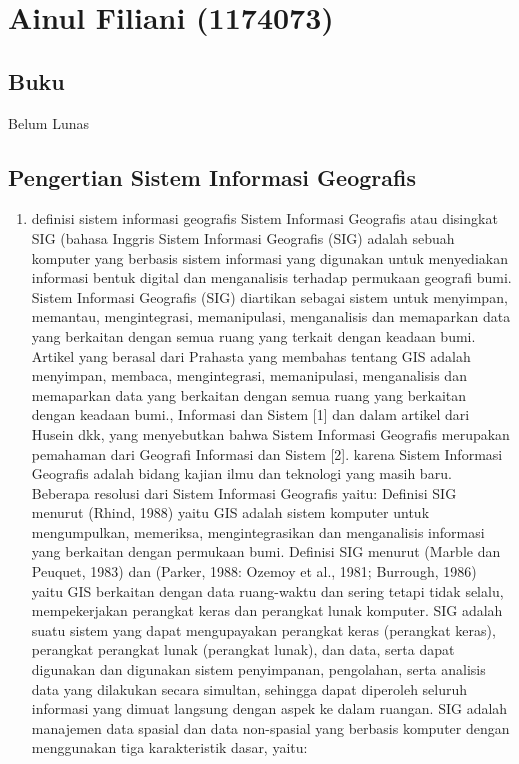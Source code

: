 \section{Ainul Filiani (1174073)}
\subsection{Buku}
Belum Lunas 
\subsection{Pengertian Sistem Informasi Geografis}
\begin{enumerate}
\item definisi sistem informasi geografis 
Sistem Informasi Geografis atau disingkat SIG (bahasa Inggris Sistem Informasi Geografis (SIG) adalah sebuah komputer yang berbasis sistem informasi yang digunakan untuk menyediakan informasi bentuk digital dan menganalisis terhadap permukaan geografi bumi. Sistem Informasi Geografis (SIG) diartikan sebagai sistem untuk menyimpan, memantau, mengintegrasi, memanipulasi, menganalisis dan memaparkan data yang berkaitan dengan semua ruang yang terkait dengan keadaan bumi. Artikel yang berasal dari Prahasta yang membahas tentang GIS adalah menyimpan, membaca, mengintegrasi, memanipulasi, menganalisis dan memaparkan data yang berkaitan dengan semua ruang yang berkaitan dengan keadaan bumi., Informasi dan Sistem 
[1] dan dalam artikel dari Husein dkk, yang menyebutkan bahwa Sistem Informasi Geografis merupakan pemahaman dari Geografi Informasi dan Sistem [2].
karena Sistem Informasi Geografis adalah bidang kajian ilmu dan teknologi yang masih baru. Beberapa resolusi dari Sistem Informasi Geografis yaitu:
Definisi SIG menurut (Rhind, 1988) yaitu GIS adalah sistem komputer untuk mengumpulkan, memeriksa, mengintegrasikan dan menganalisis informasi yang berkaitan dengan permukaan bumi. 
Definisi SIG menurut (Marble dan Peuquet, 1983) dan (Parker, 1988: Ozemoy et al., 1981; Burrough, 1986) yaitu GIS berkaitan dengan data ruang-waktu dan sering tetapi tidak selalu, mempekerjakan perangkat keras dan perangkat lunak komputer.
SIG adalah suatu sistem yang dapat mengupayakan perangkat keras (perangkat keras), perangkat perangkat lunak (perangkat lunak), dan data, serta dapat digunakan dan digunakan sistem penyimpanan, pengolahan, serta analisis data yang dilakukan secara simultan, sehingga dapat diperoleh seluruh informasi yang dimuat langsung dengan aspek ke dalam ruangan.  SIG adalah manajemen data spasial dan data non-spasial yang berbasis komputer dengan menggunakan tiga karakteristik dasar, yaitu: 

\end{enumerate}

